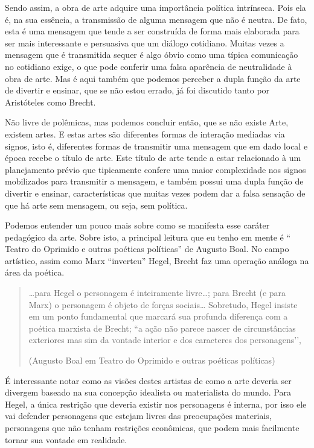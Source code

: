 Sendo assim, a obra de arte adquire uma importância política intrínseca. Pois ela é, na sua essência, a transmissão de alguma mensagem que não é neutra. De fato, esta é uma mensagem que tende a ser construída de forma mais elaborada para ser mais interessante e persuasiva que um diálogo cotidiano. Muitas vezes a mensagem que é transmitida sequer é algo óbvio como uma típica comunicação no cotidiano exige, o que pode conferir uma falsa aparência de neutralidade à obra de arte. Mas é aqui também que podemos perceber a dupla função da arte de divertir e ensinar, que se não estou errado, já foi discutido tanto por Aristóteles como Brecht.

Não livre de polêmicas, mas podemos concluir então, que se não existe Arte, existem artes. E estas artes são diferentes formas de interação mediadas via signos, isto é, diferentes formas de transmitir uma mensagem que em dado local e época recebe o título de arte. Este título de arte tende a estar relacionado à um planejamento prévio que tipicamente confere uma maior complexidade nos signos mobilizados para transmitir a mensagem, e também possui uma dupla função de divertir e ensinar, características que muitas vezes podem dar a falsa sensação de que há arte sem mensagem, ou seja, sem política.

Podemos entender um pouco mais sobre como se manifesta esse caráter pedagógico da arte. Sobre isto, a principal leitura que eu tenho em mente é “ Teatro do Oprimido e outras poéticas políticas” de Augusto Boal. No campo artístico, assim como Marx “inverteu” Hegel, Brecht faz uma operação análoga na área da poética.

\begin{quote}
…para Hegel o personagem é inteiramente livre…; para Brecht (e para Marx) o personagem é objeto de forças sociais… Sobretudo, Hegel insiste em um ponto fundamental que marcará sua profunda diferença com a poética marxista de Brecht; “a ação não parece nascer de circunstâncias exteriores mas sim da vontade interior e dos caracteres dos personagens’’,

(Augusto Boal em Teatro do Oprimido e outras poéticas políticas)
\end{quote}

É interessante notar como as visões destes artistas de como a arte deveria ser divergem baseado na sua concepção idealista ou materialista do mundo. Para Hegel, a única restrição que deveria existir nos personagens é interna, por isso ele vai defender personagens que estejam livres das preocupações materiais, personagens que não tenham restrições econômicas, que podem mais facilmente tornar sua vontade em realidade.

